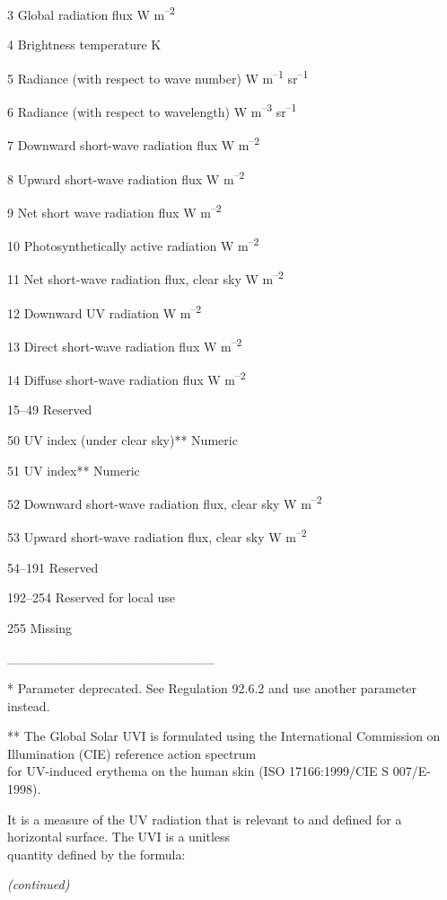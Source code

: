 3 Global radiation flux W m\textsuperscript{--2}

4 Brightness temperature K

5 Radiance (with respect to wave number) W m\textsuperscript{--1} sr\textsuperscript{--1}

6 Radiance (with respect to wavelength) W m\textsuperscript{--3} sr\textsuperscript{--1}

7 Downward short-wave radiation flux W m\textsuperscript{--2}

8 Upward short-wave radiation flux W m\textsuperscript{--2}

9 Net short wave radiation flux W m\textsuperscript{--2}

10 Photosynthetically active radiation W m\textsuperscript{--2}

11 Net short-wave radiation flux, clear sky W m\textsuperscript{--2}

12 Downward UV radiation W m\textsuperscript{--2}

13 Direct short-wave radiation flux W m\textsuperscript{--2}

14 Diffuse short-wave radiation flux W m\textsuperscript{--2}

15--49 Reserved

50 UV index (under clear sky)** Numeric

51 UV index** Numeric

52 Downward short-wave radiation flux, clear sky W m\textsuperscript{--2}

53 Upward short-wave radiation flux, clear sky W m\textsuperscript{--2}

54--191 Reserved

192--254 Reserved for local use

255 Missing

\_\_\_\_\_\_\_\_\_\_\_\_\_\_\_\_\_\_\_\_\_\_

* Parameter deprecated. See Regulation 92.6.2 and use another parameter instead.

** The Global Solar UVI is formulated using the International Commission on Illumination (CIE) reference action spectrum\\
for UV-induced erythema on the human skin (ISO 17166:1999/CIE S 007/E-1998).

It is a measure of the UV radiation that is relevant to and defined for a horizontal surface. The UVI is a unitless\\
quantity defined by the formula:

\emph{(continued)}

